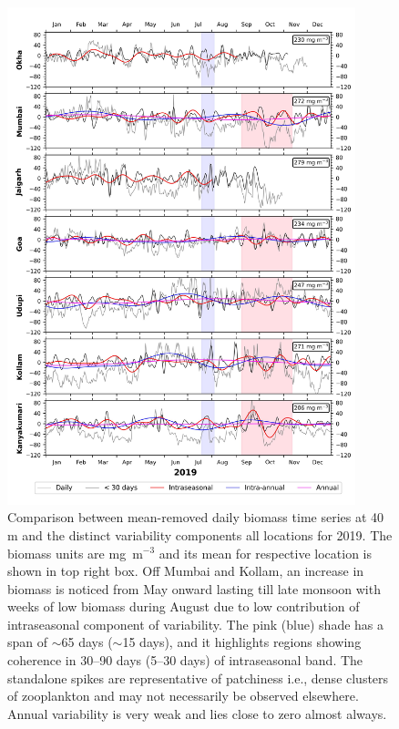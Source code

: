 \documentclass[authoryear,review,12pt]{elsarticle}
\begin{document}
\begin{figure}[htbp]
	\begin{adjustwidth}{-0.5in}{0in} 
	\centering
	\includegraphics[width=0.9\textwidth]{./figures/biomass_40m_2019_variability.jpeg} 
	\captionsetup{justification=justified,font=footnotesize,skip=0.05\baselineskip,width=\textwidth}
	\caption{Comparison between mean-removed daily biomass time series at 40 m and the distinct variability components all locations for 2019. The biomass units are mg~m$^{-3}$ and its mean for respective location is shown in top right box. Off Mumbai and Kollam, an increase in biomass is noticed from May onward lasting till late monsoon with weeks of low biomass during August due to low contribution of intraseasonal component of variability. The pink (blue) shade has a span of $\sim$65 days ($\sim$15 days), and it highlights regions showing coherence in 30--90 days (5--30 days) of intraseasonal band. The standalone spikes are representative of patchiness i.e., dense clusters of zooplankton and may not necessarily be observed elsewhere. Annual variability is very weak and lies close to zero almost always.}
	\label{fig:variability}
	\end{adjustwidth}
\end{figure}
\end{document}
